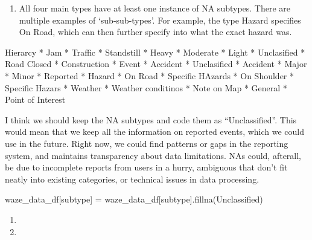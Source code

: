 \documentclass[
  letterpaper,
  DIV=11,
  numbers=noendperiod]{scrartcl}
\newenvironment{Shaded}{\begin{snugshade}}{\end{snugshade}}
\newcommand{\NormalTok}[1]{\textcolor[rgb]{0.00,0.23,0.31}{#1}}
\newcommand{\OperatorTok}[1]{\textcolor[rgb]{0.37,0.37,0.37}{#1}}
\newcommand{\StringTok}[1]{\textcolor[rgb]{0.13,0.47,0.30}{#1}}
\providecommand{\tightlist}{%
  \setlength{\itemsep}{0pt}\setlength{\parskip}{0pt}}\usepackage{longtable,booktabs,array}
\begin{document}
\begin{enumerate}
\def\labelenumi{\alph{enumi}.}
\tightlist
\item
  All four main types have at least one instance of NA subtypes. There
  are multiple examples of `sub-sub-types'. For example, the type Hazard
  specifies On Road, which can then further specify into what the exact
  hazard was.
\end{enumerate}

Hierarcy * Jam * Traffic * Standstill * Heavy * Moderate * Light *
Unclasified * Road Closed * Construction * Event * Accident *
Unclasified * Accident * Major * Minor * Reported * Hazard * On Road *
Specific HAzards * On Shoulder * Specific Hazars * Weather * Weather
conditinos * Note on Map * General * Point of Interest

I think we should keep the NA subtypes and code them as
``Unclassified''. This would mean that we keep all the information on
reported events, which we could use in the future. Right now, we could
find patterns or gaps in the reporting system, and maintains
transparency about data limitations. NAs could, afterall, be due to
incomplete reports from users in a hurry, ambiguous that don't fit
neatly into existing categories, or technical issues in data processing.

\begin{Shaded}
\begin{Highlighting}[]
\NormalTok{waze\_data\_df[}\StringTok{\textquotesingle{}subtype\textquotesingle{}}\NormalTok{] }\OperatorTok{=}\NormalTok{ waze\_data\_df[}\StringTok{\textquotesingle{}subtype\textquotesingle{}}\NormalTok{].fillna(}\StringTok{\textquotesingle{}Unclassified\textquotesingle{}}\NormalTok{)}
\end{Highlighting}
\end{Shaded}

\begin{enumerate}
\def\labelenumi{\arabic{enumi}.}
\setcounter{enumi}{3}
\tightlist
\item
\item
\end{enumerate}
\end{document}
